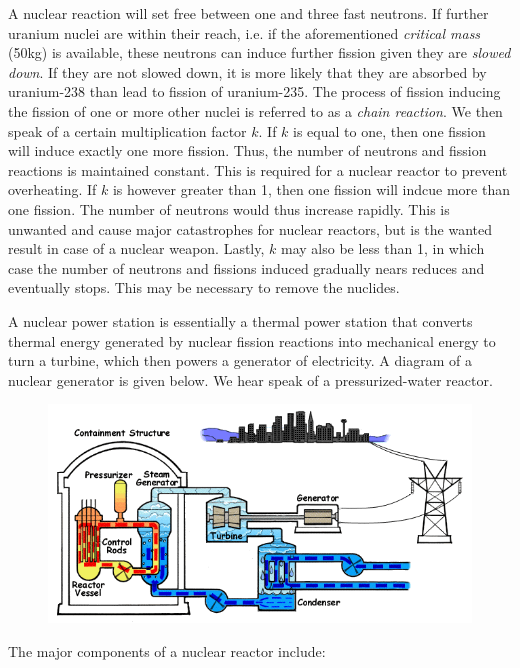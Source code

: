 A nuclear reaction will set free between one and three fast neutrons. If further uranium nuclei are within their reach, i.e. if the aforementioned \emph{critical mass} (50kg) is available, these neutrons can induce further fission given they are \emph{slowed down}. If they are not slowed down, it is more likely that they are absorbed by uranium-238 than lead to fission of uranium-235. The process of fission inducing the fission of one or more other nuclei is referred to as a \emph{chain reaction}. We then speak of a certain multiplication factor $k$. If $k$ is equal to one, then one fission will induce exactly one more fission. Thus, the number of neutrons and fission reactions is maintained constant. This is required for a nuclear reactor to prevent overheating. If $k$ is however greater than 1, then one fission will indcue more than one fission. The number of neutrons would thus increase rapidly. This is unwanted and cause major catastrophes for nuclear reactors, but is the wanted result in case of a nuclear weapon. Lastly, $k$ may also be less than 1, in which case the number of neutrons and fissions induced gradually nears reduces and eventually stops. This may be necessary to remove the nuclides.


A nuclear power station is essentially a thermal power station that converts thermal energy generated by nuclear fission reactions into mechanical energy to turn a turbine, which then powers a generator of electricity. A diagram of a nuclear generator is given below. We hear speak of a pressurized-water reactor.

\begin{figure}[h!]
	\centering
	\includegraphics[scale=0.65]{img/reactor}
\end{figure}

The major components of a nuclear reactor include:

